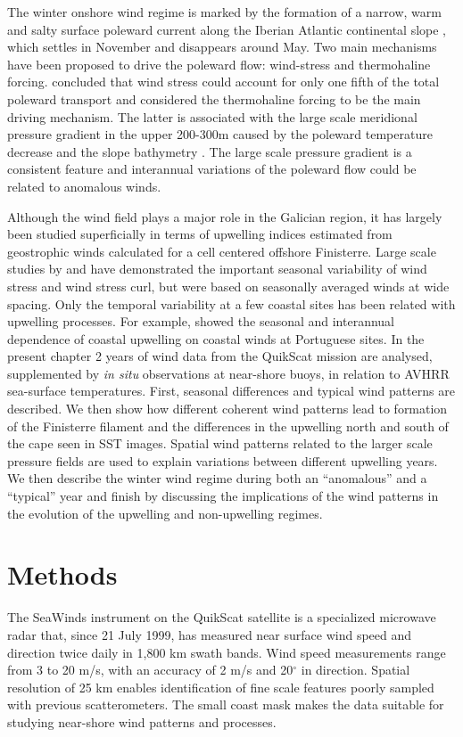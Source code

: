 The winter onshore wind regime is marked by the formation of a
narrow, warm and salty surface poleward current along the Iberian
Atlantic continental slope \citep{Frouin90,Haynes90}, which
settles in November and disappears around May. Two main mechanisms
have been proposed to drive the poleward flow: wind-stress and
thermohaline forcing. \citet{Frouin90} concluded that wind stress
could account for only one fifth of the total poleward transport
and considered the thermohaline forcing to be the main driving
mechanism. The latter is associated with the large scale
meridional pressure gradient in the upper 200-300m caused by the
poleward temperature decrease and the slope bathymetry
\citep{Huthnance95}. The large scale pressure gradient is a
consistent feature and interannual variations of the poleward flow
could be related to anomalous winds.

Although the wind field plays a major role in the Galician region,
it has largely been studied superficially in terms of upwelling
indices estimated from geostrophic winds calculated for a cell
centered offshore Finisterre. Large scale studies by
\citet{Bakun91} and \citet{Wooster76} have demonstrated the
important seasonal variability of wind stress and wind stress
curl, but were based on seasonally averaged winds at wide spacing.
Only the temporal variability at a few coastal sites has been
related with upwelling processes. For example, \citet{Fiuza82b}
showed the seasonal and interannual dependence of coastal
upwelling on coastal winds at Portuguese sites. In the present
chapter 2 years of wind data from the QuikScat mission are
analysed, supplemented by {\it in situ} observations at near-shore
buoys, in relation to AVHRR sea-surface temperatures. First,
seasonal differences and typical wind patterns are described. We
then show how different coherent wind patterns lead to formation
of the Finisterre filament and the differences in the upwelling
north and south of the cape seen in SST images. Spatial wind
patterns related to the larger scale pressure fields are used to
explain variations between different upwelling years. We then
describe the winter wind regime during both an ``anomalous'' and a
``typical'' year and finish by discussing the implications of the
wind patterns in the evolution of the upwelling and non-upwelling
regimes.

\section{Methods}
\label{metodos}  The SeaWinds instrument on the QuikScat satellite
is a specialized microwave radar that, since 21 July 1999, has
measured near surface wind speed and direction twice daily in
1,800 km swath bands. Wind speed measurements range from 3 to 20
m/s, with an accuracy of 2 m/s and 20$^{\circ}$ in direction.
Spatial resolution of 25 km enables identification of fine scale
features poorly sampled with previous scatterometers. The small
coast mask makes the data suitable for studying near-shore wind
patterns and processes.


